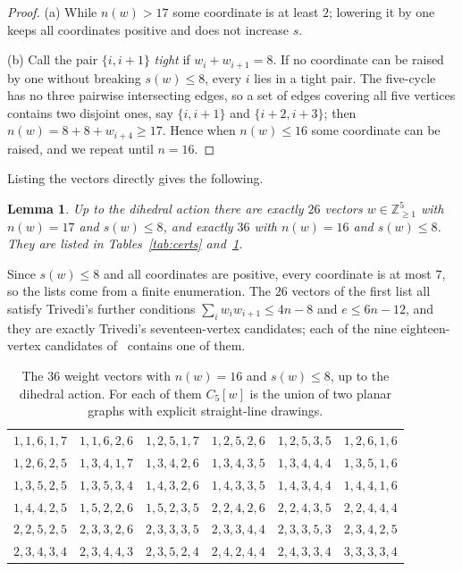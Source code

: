 \documentclass[11pt]{amsart}
\newtheorem{lemma}[theorem]{Lemma}
\theoremstyle{definition}
\theoremstyle{remark}
\numberwithin{equation}{section}
\newcommand{\Z}{\mathbb{Z}}
\newcommand{\cw}{C_5[w]}
\begin{document}
\begin{proof}
(a) While $n(w)>17$ some coordinate is at least $2$; lowering it by one keeps all coordinates positive and does not increase $s$.

(b) Call the pair $\{i,i+1\}$ \emph{tight} if $w_i+w_{i+1}=8$. If no coordinate can be raised by one without breaking $s(w)\le8$, every $i$ lies in a tight pair. The five-cycle has no three pairwise intersecting edges, so a set of edges covering all five vertices contains two disjoint ones, say $\{i,i+1\}$ and $\{i+2,i+3\}$; then $n(w)=8+8+w_{i+4}\ge17$. Hence when $n(w)\le16$ some coordinate can be raised, and we repeat until $n=16$.
\end{proof}

Listing the vectors directly gives the following.

\begin{lemma}\label{lem:lists}
Up to the dihedral action there are exactly $26$ vectors $w\in\Z_{\ge1}^5$ with $n(w)=17$ and $s(w)\le8$, and exactly $36$ with $n(w)=16$ and $s(w)\le8$. They are listed in Tables~\ref{tab:certs} and~\ref{tab:sixteen}.
\end{lemma}

Since $s(w)\le8$ and all coordinates are positive, every coordinate is at most $7$, so the lists come from a finite enumeration. The $26$ vectors of the first list all satisfy Trivedi's further conditions $\sum_i w_iw_{i+1}\le4n-8$ and $e\le6n-12$, and they are exactly Trivedi's seventeen-vertex candidates; each of the nine eighteen-vertex candidates of~\cite{Tr} contains one of them.

\begin{table}[ht]
\centering\small
\begin{tabular}{cccccc}
\toprule
$1,1,6,1,7$ & $1,1,6,2,6$ & $1,2,5,1,7$ & $1,2,5,2,6$ & $1,2,5,3,5$ & $1,2,6,1,6$\\
$1,2,6,2,5$ & $1,3,4,1,7$ & $1,3,4,2,6$ & $1,3,4,3,5$ & $1,3,4,4,4$ & $1,3,5,1,6$\\
$1,3,5,2,5$ & $1,3,5,3,4$ & $1,4,3,2,6$ & $1,4,3,3,5$ & $1,4,3,4,4$ & $1,4,4,1,6$\\
$1,4,4,2,5$ & $1,5,2,2,6$ & $1,5,2,3,5$ & $2,2,4,2,6$ & $2,2,4,3,5$ & $2,2,4,4,4$\\
$2,2,5,2,5$ & $2,3,3,2,6$ & $2,3,3,3,5$ & $2,3,3,4,4$ & $2,3,3,5,3$ & $2,3,4,2,5$\\
$2,3,4,3,4$ & $2,3,4,4,3$ & $2,3,5,2,4$ & $2,4,2,4,4$ & $2,4,3,3,4$ & $3,3,3,3,4$\\
\bottomrule
\end{tabular}
\caption{The $36$ weight vectors with $n(w)=16$ and $s(w)\le8$, up to the dihedral action. For each of them $\cw$ is the union of two planar graphs with explicit straight-line drawings.}\label{tab:sixteen}
\end{table}
\end{document}
